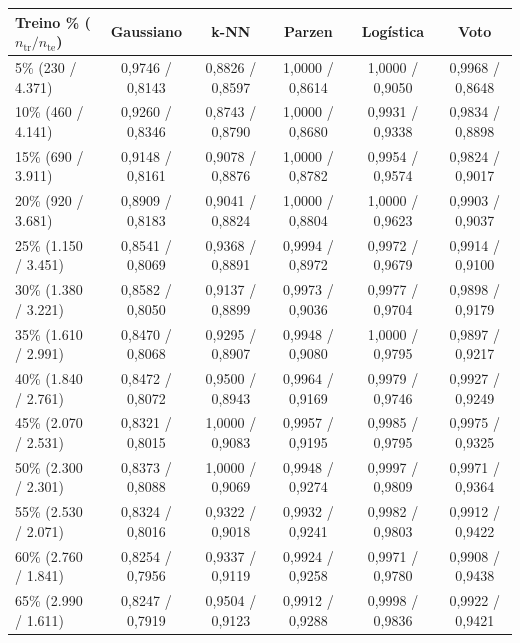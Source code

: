 \documentclass[a4paper,11pt]{article}
\begin{document}
\begin{center}
\begin{minipage}{\linewidth}
\centering
{}
\footnotesize
\setlength{\tabcolsep}{2.5pt}
\renewcommand{\arraystretch}{1.18}
\begin{tabular}{l c c c c c}
\toprule
\textbf{Treino \% ($n_{\text{tr}} / n_{\text{te}}$)} & \textbf{Gaussiano} & \textbf{k-NN} & \textbf{Parzen} & \textbf{Logística} & \textbf{Voto} \\
\midrule
5\% (230 / 4.371) & 0,9746 / 0,8143 & 0,8826 / 0,8597 & 1,0000 / 0,8614 & 1,0000 / 0,9050 & 0,9968 / 0,8648 \\
10\% (460 / 4.141) & 0,9260 / 0,8346 & 0,8743 / 0,8790 & 1,0000 / 0,8680 & 0,9931 / 0,9338 & 0,9834 / 0,8898 \\
15\% (690 / 3.911) & 0,9148 / 0,8161 & 0,9078 / 0,8876 & 1,0000 / 0,8782 & 0,9954 / 0,9574 & 0,9824 / 0,9017 \\
20\% (920 / 3.681) & 0,8909 / 0,8183 & 0,9041 / 0,8824 & 1,0000 / 0,8804 & 1,0000 / 0,9623 & 0,9903 / 0,9037 \\
25\% (1.150 / 3.451) & 0,8541 / 0,8069 & 0,9368 / 0,8891 & 0,9994 / 0,8972 & 0,9972 / 0,9679 & 0,9914 / 0,9100 \\
30\% (1.380 / 3.221) & 0,8582 / 0,8050 & 0,9137 / 0,8899 & 0,9973 / 0,9036 & 0,9977 / 0,9704 & 0,9898 / 0,9179 \\
35\% (1.610 / 2.991) & 0,8470 / 0,8068 & 0,9295 / 0,8907 & 0,9948 / 0,9080 & 1,0000 / 0,9795 & 0,9897 / 0,9217 \\
40\% (1.840 / 2.761) & 0,8472 / 0,8072 & 0,9500 / 0,8943 & 0,9964 / 0,9169 & 0,9979 / 0,9746 & 0,9927 / 0,9249 \\
45\% (2.070 / 2.531) & 0,8321 / 0,8015 & 1,0000 / 0,9083 & 0,9957 / 0,9195 & 0,9985 / 0,9795 & 0,9975 / 0,9325 \\
50\% (2.300 / 2.301) & 0,8373 / 0,8088 & 1,0000 / 0,9069 & 0,9948 / 0,9274 & 0,9997 / 0,9809 & 0,9971 / 0,9364 \\
55\% (2.530 / 2.071) & 0,8324 / 0,8016 & 0,9322 / 0,9018 & 0,9932 / 0,9241 & 0,9982 / 0,9803 & 0,9912 / 0,9422 \\
60\% (2.760 / 1.841) & 0,8254 / 0,7956 & 0,9337 / 0,9119 & 0,9924 / 0,9258 & 0,9971 / 0,9780 & 0,9908 / 0,9438 \\
65\% (2.990 / 1.611) & 0,8247 / 0,7919 & 0,9504 / 0,9123 & 0,9912 / 0,9288 & 0,9998 / 0,9836 & 0,9922 / 0,9421 \\

\end{tabular}
\end{minipage}
\end{center}
\end{document}
